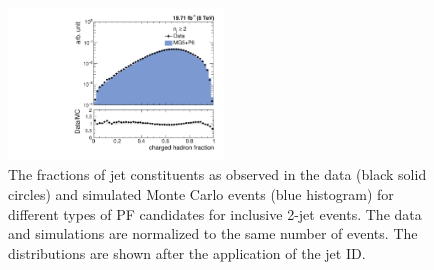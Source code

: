 \begin{figure}[!htbp]
\begin{center}
 \vspace*{1mm}
 \includegraphics[width=0.51\textwidth]{Plots_HT_2_150/Comparison_ChHadFrac_2_HT_2_150.pdf}
 \caption[The fractions of jet constituents for different types of PF candidates for inclusive 2-jet events.]{The fractions of jet constituents as observed in the data (black solid circles) and simulated Monte Carlo events (blue histogram) for different types of PF candidates for inclusive 2-jet events. The data and simulations are normalized to the same number of events. The distributions are shown after the application of the jet ID.}
 \label{fig:qual2}
 \end{center}
\end{figure} 

